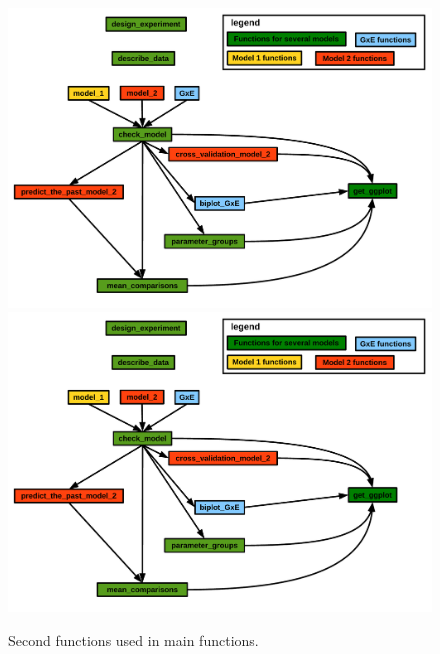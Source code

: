 \documentclass{book}\usepackage[]{graphicx}\usepackage[]{color}
\begin{document}
\begin{figure}[H]
\begin{center}
\includegraphics[width=\textwidth,page=2]{PBBstats_function_relations}
\includegraphics[width=\textwidth,page=3]{PBBstats_function_relations}
\end{center}
\caption{Second functions used in main functions.}
\label{workflow_2}
\end{figure}
\end{document}
